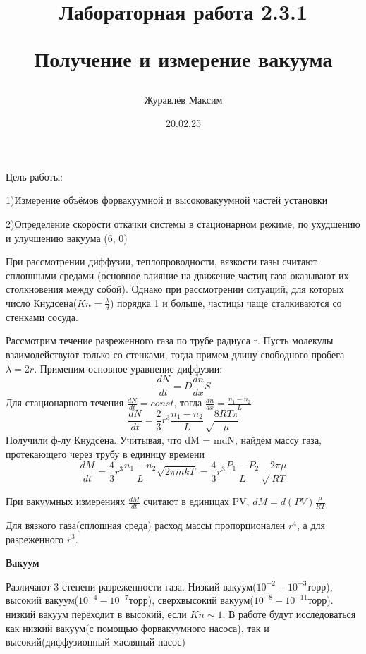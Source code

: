 \documentclass[a4paper]{article}
\begin{document}
\title{Лабораторная работа 2.3.1  \par \textbf{Получение и измерение вакуума}}
\author{Журавлёв Максим}
\date{20.02.25}
\maketitle

\vspace{20pt}
Цель работы:\par
1)Измерение объёмов форвакуумной и высоковакуумной частей установки \par
2)Определение скорости откачки системы в стационарном режиме, по ухудшению и улучшению вакуума
\line(6, 0){\textwidth}

\vspace{20pt}
При рассмотрении диффузии, теплопроводности, вязкости газы считают сплошными средами
(основное влияние на движение частиц газа оказывают их столкновения между собой). Однако при рассмотрении
ситуаций, для которых число Кнудсена($Kn = \frac{\lambda}{d}$) порядка 1 и больше, частицы
чаще сталкиваются со стенками сосуда.  \vspace{5pt}

Рассмотрим течение разреженного газа по трубе радиуса r. Пусть молекулы взаимодействуют только со
стенками, тогда примем длину свободного пробега $\lambda = 2r$. Применим основное уравнение диффузии:
\[\frac{dN}{dt} = D\frac{dn}{dx}S\] 
Для стационарного течения $\frac{dN}{dt} = const$, тогда $\frac{dn}{dx} = \frac{n_1 - n_2}{L}$
\[\frac{dN}{dt} = \frac{2}{3}r^3\frac{n_1 - n_2}{L}\sqrt\frac{8RT\pi}{\mu}\]
Получили ф-лу Кнудсена. Учитывая, что dM = mdN, найдём массу газа, протекающего через трубу в единицу времени
\[\frac{dM}{dt} = \frac{4}{3}r^3\frac{n_1 - n_2}{L}\sqrt{2\pi{mkT}} = \frac{4}{3}r^3\frac{P_1 - P_2}{L}\sqrt\frac{2\pi\mu}{RT}\]

При вакуумных измерениях $\frac{dM}{dt}$ считают в единицах PV, $dM = d(PV)\frac{\mu}{RT}$\par
\vspace{3pt}
Для вязкого газа(сплошная среда) расход массы пропорционален $r^4$, а для разреженного $r^3$.

\pagebreak

\textbf{Вакуум}

Различают 3 степени разреженности газа. Низкий вакуум($10^{-2} - 10^{-3}$торр), высокий вакуум($10^{-4} - 10^{-7}$торр), сверхвысокий вакуум($10^{-8} - 10^{-11}$торр).
низкий вакуум переходит в высокий, если $Kn \sim 1$. В работе будут исследоваться как низкий вакуум(с помощью форвакуумного насоса), так и высокий(диффузионный масляный насос) 
\vspace{5pt}
\end{document}
